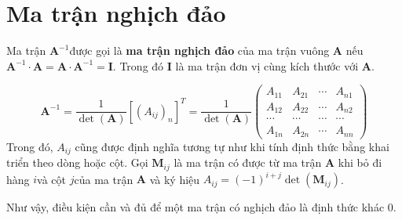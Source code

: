 \documentclass{mynotes}
\begin{document}
\section{Ma trận nghịch đảo}

Ma trận $\bm{A}^{-1}$​ được gọi là \textbf{ma trận nghịch đảo} của ma trận vuông $\bm{A}$ nếu $\bm{A}^{-1} \cdot \bm{A} = \bm{A} \cdot \bm{A}^{-1} = \bm{I}$​. Trong đó $\bm{I}$ là ma trận đơn vị cùng kích thước với $\bm{A}$.

\begin{equation}
    \bm{A}^{-1}=\frac{1}{\det(\bm{A})}[(A_{ij})_n]^T=\frac{1}{\det(\bm{A})}\begin{pmatrix} A_{11} & A_{21} & \cdots & A_{n1} \\ A_{12} & A_{22} & \cdots & A_{n2} \\ \cdots & \cdots & \cdots & \cdots \\ A_{1n} & A_{2n} & \cdots & A_{nn} \end{pmatrix}
\end{equation}
Trong đó, $A_{ij}$ cũng được định nghĩa tương tự như khi tính định thức bằng khai triển theo dòng hoặc cột. Gọi $\bm{M}_{ij}$ là ma trận có được từ ma trận $\bm{A}$ khi bỏ đi hàng $i$​ và cột $j$​ của ma trận $\bm{A}$ và ký hiệu $A_{ij}=(-1)^{i+j} \det (\bm{M}_{ij})$.

Như vậy, điều kiện cần và đủ để một ma trận có nghịch đảo là định thức khác 0.



































\printbibliography[heading=bibintoc,title={Tài liệu tham khảo}]

\appendix




\end{document}
